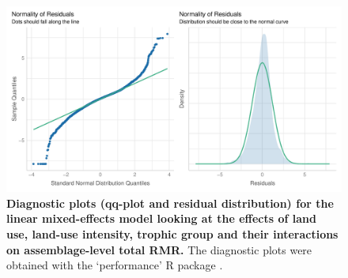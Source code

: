 \begin{figure}[h!]
\centering
\includegraphics[scale=0.75]{Supporting/Chapter5/Figures/Diagnostics_tRMR}
\caption[Diagnostic plots for the linear mixed-effects model looking at the effects of land use, land-use intensity, trophic group and their interactions on assemblage-level total RMR]{\textbf{Diagnostic plots (qq-plot and residual distribution) for the linear mixed-effects model looking at the effects of land use, land-use intensity, trophic group and their interactions on assemblage-level total RMR.} The diagnostic plots were obtained with the `performance' R package \citep{performance}.}
\label{SI5_figure3}
\end{figure}

